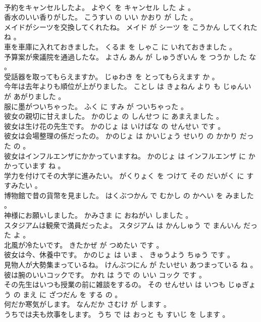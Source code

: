 \documentclass[8pt]{extreport}
\begin{document}
\begin{CJK}{UTF8}{min}
\\	予約をキャンセルしたよ。	よやく を キャンセル した よ 。 
\\	香水のいい香りがした。	こうすい の いい かおり が した 。 
\\	メイドがシーツを交換してくれたね。	メイド が シーツ を こうかん してくれた ね 。 
\\	車を車庫に入れておきました。	くるま を しゃこ に いれておきました 。 
\\	予算案が衆議院を通過したな。	よさん あん が しゅうぎいん を つうか した な 。 
\\	受話器を取ってもらえますか。	じゅわき を とってもらえます か 。 
\\	今年は去年よりも順位が上がりました。	ことし は きょねん より も じゅんい が あがりました 。 
\\	服に墨がついちゃった。	ふく に すみ が ついちゃった 。 
\\	彼女の親切に甘えました。	かのじょ の しんせつ に あまえました 。 
\\	彼女は生け花の先生です。	かのじょ は いけばな の せんせい です 。 
\\	彼女は会場整理の係だったの。	かのじょ は かいじょう せいり の かかり だった の 。 
\\	彼女はインフルエンザにかかっていますね。	かのじょ は インフルエンザ に かかっています ね 。 
\\	学力を付けてその大学に進みたい。	がくりょく を つけて その だいがく に すすみたい 。 
\\	博物館で昔の貨幣を見ました。	はくぶつかん で むかし の かへい を みました 。 
\\	神様にお願いしました。	かみさま に おねがい しました 。 
\\	スタジアムは観衆で満員だったよ。	スタジアム は かんしゅう で まんいん だった よ 。 
\\	北風が冷たいです。	きたかぜ が つめたい です 。 
\\	彼女は今、休養中です。	かのじょ は いま 、 きゅうよう ちゅう です 。 
\\	見物人が大勢集まっているね。	けんぶつにん が たいせい あつまっている ね 。 
\\	彼は腕のいいコックです。	かれ は うで の いい コック です 。 
\\	その先生はいつも授業の前に雑談をするの。	その せんせい は いつも じゅぎょう の まえ に ざつだん を する の 。 
\\	何だか寒気がします。	なんだか さむけ が します 。 
\\	うちでは夫も炊事をします。	うち で は おっと も すいじ を します 。 

\end{CJK}
\end{document}
